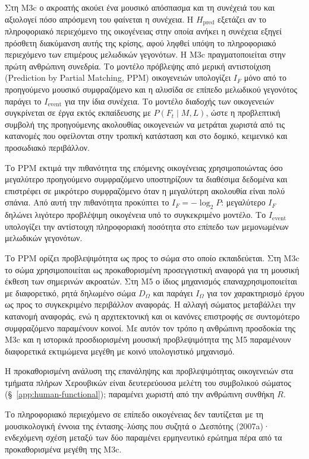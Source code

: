 \documentclass[11pt,a4paper]{article}
\begin{document}
Στη M3c ο ακροατής ακούει ένα μουσικό απόσπασμα και τη συνέχειά του και αξιολογεί πόσο απρόσμενη του φαίνεται η συνέχεια. Η $H_{\mathrm{pred}}$ εξετάζει αν το πληροφοριακό περιεχόμενο της οικογένειας στην οποία ανήκει η συνέχεια εξηγεί πρόσθετη διακύμανση αυτής της κρίσης, αφού ληφθεί υπόψη το πληροφοριακό περιεχόμενο των επιμέρους μελωδικών γεγονότων. Η M3c πραγματοποιείται στην πρώτη ανθρώπινη συνεδρία. Το μοντέλο πρόβλεψης από μερική αντιστοίχιση (Prediction by Partial Matching, PPM) οικογενειών υπολογίζει $I_F$ μόνο από το προηγούμενο μουσικό συμφραζόμενο και η αλυσίδα σε επίπεδο μελωδικού γεγονότος παράγει το $I_{\mathrm{event}}$ για την ίδια συνέχεια. Το μοντέλο διαδοχής των οικογενειών συγκρίνεται σε έργα εκτός εκπαίδευσης με $P(F_t\mid M,L)$, ώστε η προβλεπτική συμβολή της προηγούμενης ακολουθίας οικογενειών να μετράται χωριστά από τις κατανομές που οφείλονται στην τροπική κατάσταση και στο δομικό, κειμενικό και προσωδιακό περιβάλλον.

Το PPM εκτιμά την πιθανότητα της επόμενης οικογένειας χρησιμοποιώντας όσο μεγαλύτερο προηγούμενο συμφραζόμενο υποστηρίζουν τα διαθέσιμα δεδομένα και επιστρέφει σε μικρότερο συμφραζόμενο όταν η μεγαλύτερη ακολουθία είναι πολύ σπάνια. Από αυτή την πιθανότητα προκύπτει το $I_F=-\log_2P$: μεγαλύτερο $I_F$ δηλώνει λιγότερο προβλέψιμη οικογένεια υπό το συγκεκριμένο μοντέλο. Το $I_{\mathrm{event}}$ υπολογίζει την αντίστοιχη πληροφοριακή ποσότητα στο επίπεδο των μεμονωμένων μελωδικών γεγονότων.

Το PPM ορίζει προβλεψιμότητα ως προς το σώμα στο οποίο εκπαιδεύεται. Στη M3c το σώμα χρησιμοποιείται ως προκαθορισμένη προσεγγιστική αναφορά για τη μουσική έκθεση των σημερινών ακροατών. Στη M5 ο ίδιος μηχανισμός επαναχρησιμοποιείται με διαφορετικό, ρητά δηλωμένο σώμα $D_{\Omega}$ και παράγει $I_{\Omega}$ για τον χαρακτηρισμό έργου ως προς το συγκεκριμένο περιβάλλον αναφοράς. Η αλλαγή σώματος μεταβάλλει την κατανομή αναφοράς, ενώ η αρχιτεκτονική και οι κανόνες επιστροφής σε συντομότερο συμφραζόμενο παραμένουν κοινοί. Με αυτόν τον τρόπο η ανθρώπινη προσδοκία της M3c και η ιστορικά προσδιορισμένη μουσική προβλεψιμότητα της M5 παραμένουν διαφορετικά εκτιμώμενα μεγέθη με κοινό υπολογιστικό μηχανισμό.

Η προκαθορισμένη ανάλυση της επανάληψης και προβλεψιμότητας οικογενειών στα τμήματα πλήρων Χερουβικών είναι δευτερεύουσα μελέτη του συμβολικού σώματος (§~\ref{app:human-functional}); παραμένει χωριστή από την ανθρώπινη συνθήκη $R$.


Το πληροφοριακό περιεχόμενο σε επίπεδο οικογένειας δεν ταυτίζεται με τη μουσικολογική έννοια της έντασης--λύσης που συζητά ο Δεσπότης (2007a)· ενδεχόμενη σχέση μεταξύ των δύο παραμένει ερμηνευτικό ερώτημα πέρα από τα προκαθορισμένα μεγέθη της M3c.
\end{document}
